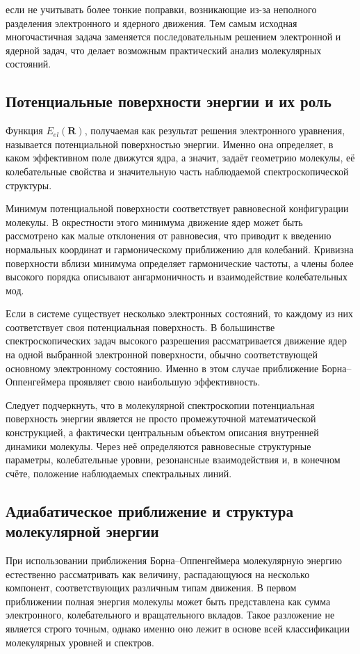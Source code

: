 если не учитывать более тонкие поправки, возникающие из-за
неполного разделения электронного и ядерного движения.
Тем самым исходная многочастичная задача заменяется последовательным
решением электронной и ядерной задач, что делает возможным
практический анализ молекулярных состояний.

\subsection{Потенциальные поверхности энергии и их роль}

Функция $E_{el}(\mathbf{R})$, получаемая как результат решения
электронного уравнения, называется потенциальной поверхностью энергии.
Именно она определяет, в каком эффективном поле движутся ядра,
а значит, задаёт геометрию молекулы, её колебательные свойства
и значительную часть наблюдаемой спектроскопической структуры.

Минимум потенциальной поверхности соответствует равновесной конфигурации
молекулы. В окрестности этого минимума движение ядер может быть
рассмотрено как малые отклонения от равновесия, что приводит
к введению нормальных координат и гармоническому приближению
для колебаний. Кривизна поверхности вблизи минимума определяет
гармонические частоты, а члены более высокого порядка описывают
ангармоничность и взаимодействие колебательных мод.

Если в системе существует несколько электронных состояний,
то каждому из них соответствует своя потенциальная поверхность.
В большинстве спектроскопических задач высокого разрешения
рассматривается движение ядер на одной выбранной электронной поверхности,
обычно соответствующей основному электронному состоянию.
Именно в этом случае приближение Борна--Оппенгеймера проявляет
свою наибольшую эффективность.

Следует подчеркнуть, что в молекулярной спектроскопии
потенциальная поверхность энергии является не просто промежуточной
математической конструкцией, а фактически центральным объектом
описания внутренней динамики молекулы. Через неё определяются
равновесные структурные параметры, колебательные уровни,
резонансные взаимодействия и, в конечном счёте, положение
наблюдаемых спектральных линий.

\subsection{Адиабатическое приближение и структура молекулярной энергии}

При использовании приближения Борна--Оппенгеймера молекулярную энергию
естественно рассматривать как величину, распадающуюся на несколько
компонент, соответствующих различным типам движения. В первом
приближении полная энергия молекулы может быть представлена как сумма
электронного, колебательного и вращательного вкладов. Такое разложение
не является строго точным, однако именно оно лежит в основе всей
классификации молекулярных уровней и спектров.

